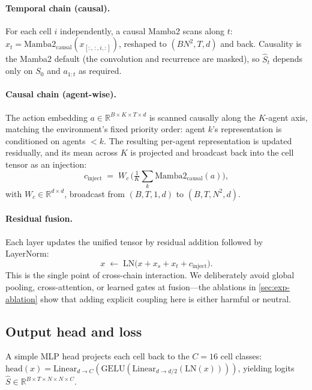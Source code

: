 \paragraph{Temporal chain (causal).}
For each cell $i$ independently, a causal Mamba2 scans along $t$:
$x_t = \mathrm{Mamba2}_{\text{causal}}(x_{[:,\,:,i,:]})$, reshaped to
$(B N^2, T, d)$ and back. Causality is the Mamba2 default (the convolution and
recurrence are masked), so $\hat{S}_t$ depends only on
$S_0$ and $a_{1:t}$ as required.

\paragraph{Causal chain (agent-wise).}
The action embedding $a\in\mathbb{R}^{B\times K\times T\times d}$ is scanned
causally along the $K$-agent axis, matching the environment's fixed priority
order: agent $k$'s representation is conditioned on agents $<k$. The resulting
per-agent representation is updated residually, and its mean across $K$ is
projected and broadcast back into the cell tensor as an injection:
\begin{equation}
c_{\text{inject}} \;=\; W_c\,\big(\tfrac{1}{K}\textstyle\sum_{k} \mathrm{Mamba2}_{\text{causal}}(a)\big),
\label{eq:causal}
\end{equation}
with $W_c\in\mathbb{R}^{d\times d}$, broadcast from $(B,T,1,d)$ to $(B,T,N^2,d)$.

\paragraph{Residual fusion.}
Each layer updates the unified tensor by residual addition followed by
LayerNorm:
\begin{equation}
x \;\leftarrow\; \mathrm{LN}\!\big(x + x_s + x_t + c_{\text{inject}}\big).
\label{eq:fusion}
\end{equation}
This is the single point of cross-chain interaction. We deliberately avoid
global pooling, cross-attention, or learned gates at fusion---the ablations in
\cref{sec:exp-ablation} show that adding explicit coupling here is either
harmful or neutral.

\subsection{Output head and loss}
\label{sec:head}

A simple MLP head projects each cell back to the $C=16$ cell classes:
$\mathrm{head}(x) = \mathrm{Linear}_{d\to C}(\mathrm{GELU}(\mathrm{Linear}_{d\to d/2}(\mathrm{LN}(x))))$,
yielding logits $\hat{S}\in\mathbb{R}^{B\times T\times N\times N\times C}$.

